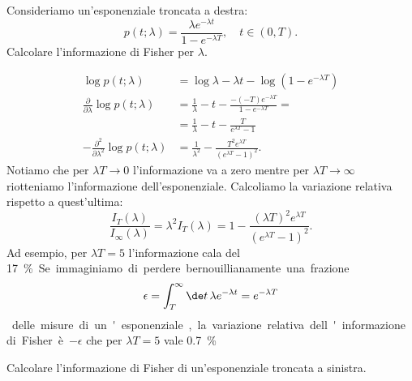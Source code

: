 
\begin{exercise}
	\label{th:troncexp}
	Consideriamo un'esponenziale troncata a destra:
	\begin{equation*}
		p(t;\lambda)
		= \frac{\lambda e^{-\lambda t}}{1 - e^{-\lambda T}},
		\quad t \in (0,T).
	\end{equation*}
	Calcolare l'informazione di Fisher per $\lambda$.
\end{exercise}

\begin{solution*}
	\begin{align*}
		\log p(t;\lambda)
		&= \log\lambda - \lambda t - \log(1-e^{-\lambda T}) \\
		\frac{\partial}{\partial\lambda} \log p(t;\lambda)
		&= \frac1\lambda - t - \frac{-(-T)e^{-\lambda T}}{1-e^{-\lambda T}} = \\
		&= \frac1\lambda - t - \frac{T}{e^{\lambda T}-1} \\
		-\frac{\partial^2}{\partial\lambda^2} \log p(t;\lambda)
		&= \frac1{\lambda^2} - \frac{T^2e^{\lambda T}}{(e^{\lambda T}-1)^2}.
	\end{align*}
	Notiamo che per $\lambda T\to0$ l'informazione va a zero mentre per $\lambda T\to\infty$
	riotteniamo l'informazione dell'esponenziale.
	Calcoliamo la variazione relativa rispetto a quest'ultima:
	\begin{equation*}
		\frac{I_T(\lambda)}{I_\infty(\lambda)}
		= \lambda^2 I_T(\lambda)
		= 1 - \frac {(\lambda T)^2e^{\lambda T}} {(e^{\lambda T}-1)^2}.
	\end{equation*}
	Ad esempio, per $\lambda T=5$ l'informazione cala del \SI{17}\percent.
	Se immaginiamo di perdere bernouillianamente una frazione
	\begin{equation*}
		\epsilon
		= \int_T^\infty \de t\, \lambda e^{-\lambda t}
		= e^{-\lambda T}
	\end{equation*}
	delle misure di un'esponenziale,
	la variazione relativa dell'informazione di Fisher è~$-\epsilon$
	che per $\lambda T=5$ vale \SI{0.7}\percent.
\end{solution*}

\begin{exercise}
	Calcolare l'informazione di Fisher di un'esponenziale troncata a sinistra.
\end{exercise}

